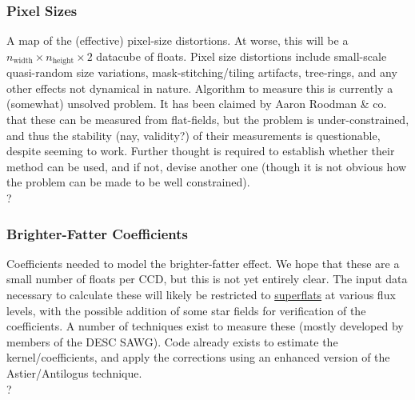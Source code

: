 \subsubsection{Pixel Sizes}\label{sec:CPP:output:pixelSizeMap} 
A map of the (effective) pixel-size distortions. At worse, this will be a $n_{\mbox{width}}\times n_{\mbox{height}}\times 2$ datacube of floats. Pixel size distortions include small-scale quasi-random size variations, mask-stitching/tiling artifacts, tree-rings, and any other effects not dynamical in nature.
\alg Algorithm to measure this is currently a (somewhat) unsolved problem. It has been claimed by Aaron Roodman \& co. that these can be measured from flat-fields, but the problem is under-constrained, and thus the stability (nay, validity?) of their measurements is questionable, despite seeming to work. Further thought is required to establish whether their method can be used, and if not, devise another one (though it is not obvious how the problem can be made to be well constrained). 
\\ \dragons ?


\subsubsection{Brighter-Fatter Coefficients}\label{sec:CPP:output:brighterFatterCoeffs}
Coefficients needed to model the brighter-fatter effect. We hope that these are a small number of floats per CCD, but this is not yet entirely clear. The input data necessary to calculate these will likely be restricted to \hyperref[sec:CPP:inputs:broadFlat]{superflats} at various flux levels, with the possible addition of some star fields for verification of the coefficients.
\alg A number of techniques exist to measure these (mostly developed by members of the DESC SAWG). Code already exists to estimate the kernel/coefficients, and apply the corrections using an enhanced version of the Astier/Antilogus technique.
\\ \dragons ?


